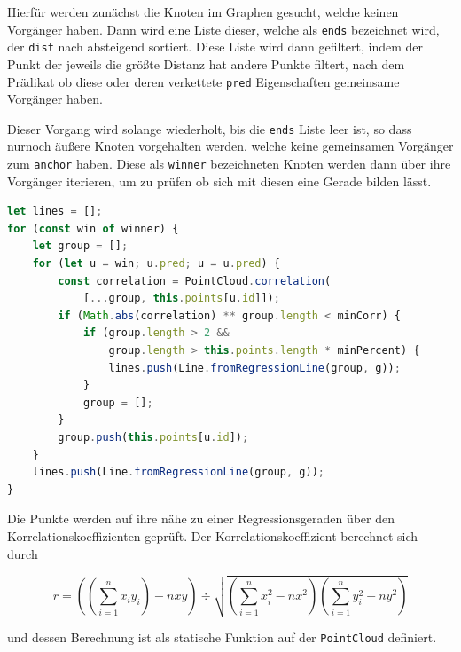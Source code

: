 Hierfür werden zunächst die Knoten im Graphen gesucht, welche keinen Vorgänger haben.
Dann wird eine Liste dieser, welche als \lstinline{ends} bezeichnet wird, der \lstinline{dist} nach absteigend sortiert.
Diese Liste wird dann gefiltert, indem der Punkt der jeweils die grö{\ss}te Distanz hat andere Punkte filtert, nach dem Prädikat ob diese oder deren verkettete \lstinline{pred} Eigenschaften gemeinsame Vorgänger haben.

Dieser Vorgang wird solange wiederholt, bis die \lstinline{ends} Liste leer ist, so dass nurnoch äu{\ss}ere Knoten vorgehalten werden, welche keine gemeinsamen Vorgänger zum \lstinline{anchor} haben.
Diese als \lstinline{winner} bezeichneten Knoten werden dann über ihre Vorgänger iterieren, um zu prüfen ob sich mit diesen eine Gerade bilden lässt.

\begin{lstlisting}[language=JavaScript, caption={Bestimmung der äu{\ss}ersten Knoten zur Bestimmung von Geraden durch den Korrelationskoeffizienten in der \lstinline{groupsByCorrelation} Funktion innerhalb der \lstinline{Dijkstra} Klasse.}, label={lst:dijkstra_correlation_part2}]
let lines = [];
for (const win of winner) {
    let group = [];
    for (let u = win; u.pred; u = u.pred) {
        const correlation = PointCloud.correlation(
            [...group, this.points[u.id]]);
        if (Math.abs(correlation) ** group.length < minCorr) {
            if (group.length > 2 &&
                group.length > this.points.length * minPercent) {
                lines.push(Line.fromRegressionLine(group, g));
            }
            group = [];
        }
        group.push(this.points[u.id]);
    }
    lines.push(Line.fromRegressionLine(group, g));
}
\end{lstlisting}

Die Punkte werden auf ihre nähe zu einer Regressionsgeraden über den Korrelationskoeffizienten geprüft.
Der Korrelationskoeffizient berechnet sich durch~\cite{Papula2014}

\begin{equation}
    r = \left(\left(\sum_{i=1}^n x_i y_i\right) - n \bar{x} \bar{y}\right) \div \sqrt{\left(\sum_{i=1}^n x_i^2 - n\bar{x}^2\right)\left(\sum_{i=1}^n y_i^2 - n \bar{y}^2\right)}
    \label{eq:korrelationskoeffizient}
\end{equation}

und dessen Berechnung ist als statische Funktion auf der \lstinline{PointCloud} definiert.

